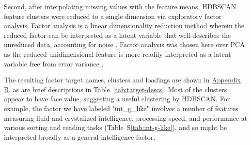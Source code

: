 \documentclass{article}
\begin{document}
Second, after interpolating missing values with the feature means, HDBSCAN
feature clusters were reduced to a single dimension via exploratory factor
analysis. Factor analysis is a linear dimensionality reduction method wherein
the reduced factor can be interpreted as a latent variable that
well-describes the unreduced data, accounting for noise
\citep{cattellScientificUseFactor1978,childEssentialsFactorAnalysis2006a}.
Factor analysis was chosen here over PCA as the reduced unidimensional
feature is more readily interpreted as a latent variable free from error
variance \cite{attiasIndependentFactorAnalysis1999}.

The resulting factor target names, clusters and loadings are shown in
\hyperref[sec:appendix-b]{Appendix B}, as are brief descriptions in
Table~\ref{tab:target-descs}. Most of the clusters appear to have face value,
suggesting a useful clustering by HDBSCAN\@. For example, the factor we have
labeled "int\_g\_like" involves a number of features measuring fluid and
crystalized intelligence, processing speed, and performance at various
sorting and reading tasks (Table~S\ref{tab:int-g-like}), and so
might be interpreted broadly as a general intelligence factor.
\end{document}
